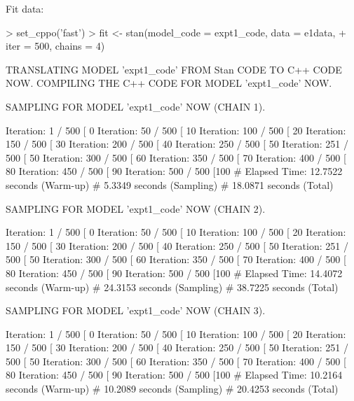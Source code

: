 \documentclass{article}
\begin{document}
Fit data:

\begin{Schunk}
\begin{Sinput}
> set_cppo('fast')
> fit <- stan(model_code = expt1_code, data = e1data, 
+             iter = 500, chains = 4)
\end{Sinput}
\begin{Soutput}
TRANSLATING MODEL 'expt1_code' FROM Stan CODE TO C++ CODE NOW.
COMPILING THE C++ CODE FOR MODEL 'expt1_code' NOW.

SAMPLING FOR MODEL 'expt1_code' NOW (CHAIN 1).

Iteration:   1 / 500 [  0%]  (Warmup)
Iteration:  50 / 500 [ 10%]  (Warmup)
Iteration: 100 / 500 [ 20%]  (Warmup)
Iteration: 150 / 500 [ 30%]  (Warmup)
Iteration: 200 / 500 [ 40%]  (Warmup)
Iteration: 250 / 500 [ 50%]  (Warmup)
Iteration: 251 / 500 [ 50%]  (Sampling)
Iteration: 300 / 500 [ 60%]  (Sampling)
Iteration: 350 / 500 [ 70%]  (Sampling)
Iteration: 400 / 500 [ 80%]  (Sampling)
Iteration: 450 / 500 [ 90%]  (Sampling)
Iteration: 500 / 500 [100%]  (Sampling)
#  Elapsed Time: 12.7522 seconds (Warm-up)
#                5.3349 seconds (Sampling)
#                18.0871 seconds (Total)


SAMPLING FOR MODEL 'expt1_code' NOW (CHAIN 2).

Iteration:   1 / 500 [  0%]  (Warmup)
Iteration:  50 / 500 [ 10%]  (Warmup)
Iteration: 100 / 500 [ 20%]  (Warmup)
Iteration: 150 / 500 [ 30%]  (Warmup)
Iteration: 200 / 500 [ 40%]  (Warmup)
Iteration: 250 / 500 [ 50%]  (Warmup)
Iteration: 251 / 500 [ 50%]  (Sampling)
Iteration: 300 / 500 [ 60%]  (Sampling)
Iteration: 350 / 500 [ 70%]  (Sampling)
Iteration: 400 / 500 [ 80%]  (Sampling)
Iteration: 450 / 500 [ 90%]  (Sampling)
Iteration: 500 / 500 [100%]  (Sampling)
#  Elapsed Time: 14.4072 seconds (Warm-up)
#                24.3153 seconds (Sampling)
#                38.7225 seconds (Total)


SAMPLING FOR MODEL 'expt1_code' NOW (CHAIN 3).

Iteration:   1 / 500 [  0%]  (Warmup)
Iteration:  50 / 500 [ 10%]  (Warmup)
Iteration: 100 / 500 [ 20%]  (Warmup)
Iteration: 150 / 500 [ 30%]  (Warmup)
Iteration: 200 / 500 [ 40%]  (Warmup)
Iteration: 250 / 500 [ 50%]  (Warmup)
Iteration: 251 / 500 [ 50%]  (Sampling)
Iteration: 300 / 500 [ 60%]  (Sampling)
Iteration: 350 / 500 [ 70%]  (Sampling)
Iteration: 400 / 500 [ 80%]  (Sampling)
Iteration: 450 / 500 [ 90%]  (Sampling)
Iteration: 500 / 500 [100%]  (Sampling)
#  Elapsed Time: 10.2164 seconds (Warm-up)
#                10.2089 seconds (Sampling)
#                20.4253 seconds (Total)



\end{Soutput}
\end{Schunk}
\end{document}
